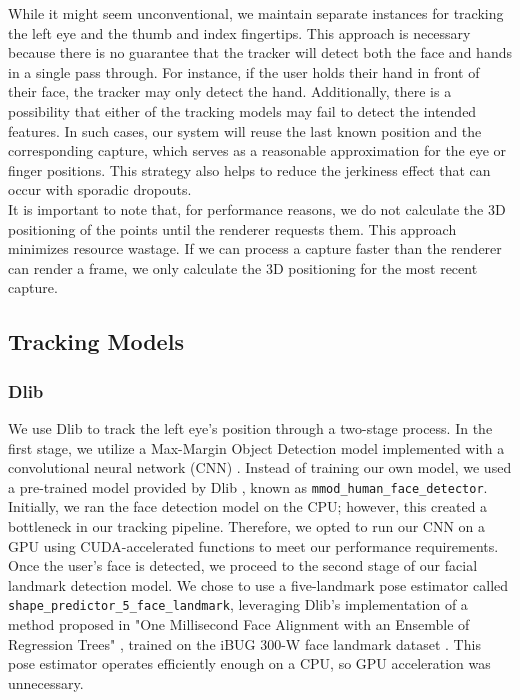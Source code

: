 While it might seem unconventional, we maintain separate instances for tracking the left eye and the thumb and index fingertips. This approach is necessary because there is no guarantee that the tracker will detect both the face and hands in a single pass through. For instance, if the user holds their hand in front of their face, the tracker may only detect the hand. Additionally, there is a possibility that either of the tracking models may fail to detect the intended features. In such cases, our system will reuse the last known position and the corresponding capture, which serves as a reasonable approximation for the eye or finger positions. This strategy also helps to reduce the jerkiness effect that can occur with sporadic dropouts. \\

It is important to note that, for performance reasons, we do not calculate the 3D positioning of the points until the renderer requests them. This approach minimizes resource wastage. If we can process a capture faster than the renderer can render a frame, we only calculate the 3D positioning for the most recent capture.

\subsection{Tracking Models}

\subsubsection{Dlib}
We use Dlib to track the left eye's position through a two-stage process. In the first stage, we utilize a Max-Margin Object Detection model \cite{king2015maxmargin, noauthor_dlib_nodate} implemented with a convolutional neural network (CNN) \cite{DBLP:journals/corr/Schmidhuber14}. Instead of training our own model, we used a pre-trained model provided by Dlib \cite{noauthor_index_nodate}, known as \texttt{mmod\_human\_face\_detector}. Initially, we ran the face detection model on the CPU; however, this created a bottleneck in our tracking pipeline. Therefore, we opted to run our CNN on a GPU using CUDA-accelerated functions to meet our performance requirements. \\

Once the user's face is detected, we proceed to the second stage of our facial landmark detection model. We chose to use a five-landmark pose estimator called \texttt{shape\_predictor\_5\_face\_landmark}, leveraging Dlib's implementation of a method proposed in "One Millisecond Face Alignment with an Ensemble of Regression Trees" \cite{6909637}, trained on the iBUG 300-W face landmark dataset \cite{6755925}. This pose estimator operates efficiently enough on a CPU, so GPU acceleration was unnecessary. \\

